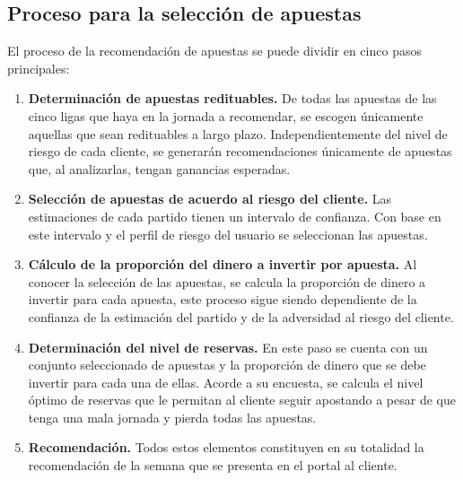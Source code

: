  \subsection{Proceso para la selección de apuestas}

%
%
 
 El proceso de la recomendación de apuestas se puede dividir en cinco pasos principales:

 \begin{enumerate}
 	\item \textbf{Determinación de apuestas redituables.} De todas las apuestas de las cinco ligas que haya en la jornada a recomendar, se escogen únicamente aquellas que sean redituables a largo plazo. Independientemente del nivel de riesgo de cada cliente, se generarán recomendaciones únicamente de apuestas que, al analizarlas, tengan ganancias esperadas.
 	\item \textbf{Selección de apuestas de acuerdo al riesgo del cliente.} Las estimaciones de cada partido tienen un intervalo de confianza. Con base en este intervalo y el perfil de riesgo del usuario se seleccionan las apuestas.
 	\item \textbf{Cálculo de la proporción del dinero a invertir por apuesta.} Al conocer la selección de las apuestas, se calcula la proporción de dinero a invertir para cada apuesta, este proceso sigue siendo dependiente de la confianza de la estimación del partido y de la adversidad al riesgo del cliente.
 	\item \textbf{Determinación del nivel de reservas.} En este paso se cuenta con un conjunto seleccionado de apuestas y la proporción de dinero que se debe invertir para cada una de ellas. Acorde a su encuesta, se calcula el nivel óptimo de reservas que le permitan al cliente seguir apostando a pesar de que tenga una mala jornada y pierda todas las apuestas.
 	\item \textbf{Recomendación.} Todos estos elementos constituyen en su totalidad la recomendación de la semana que se presenta en el portal al cliente.
 \end{enumerate}
 
